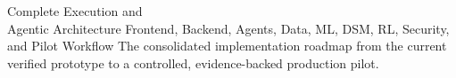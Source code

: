\documentclass[11pt,a4paper]{article}
\begin{document}
\teamtitlepage
  {Complete Execution and\\Agentic Architecture}
  {Frontend, Backend, Agents, Data, ML, DSM, RL, Security, and Pilot Workflow}
  {The consolidated implementation roadmap from the current verified prototype to a controlled,
  evidence-backed production pilot.}

\tableofcontents
\newpage

\end{document}

